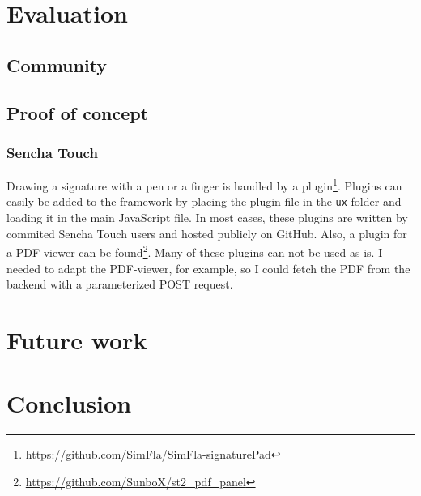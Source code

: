 \documentclass[a4paper]{artikel3}
\newcommand{\code}[1]{\texttt{#1}}
\renewcommand{\url}[1]{\href{http://#1}{#1}}
\renewcommand{\paragraph}[1]{{\bf #1} }
\begin{document}

\section{Evaluation}

\subsection{Community} %
\label{sec:community}


\subsection{Proof of concept} %
\label{sec:poc}

\subsubsection{Sencha Touch} %



Drawing a signature with a pen or a finger is handled by a plugin\footnote{\url{https://github.com/SimFla/SimFla-signaturePad}}.  Plugins can easily be added to the framework by placing the plugin file in the \code{ux} folder and loading it in the main JavaScript file.  In most cases,  these plugins are written by commited Sencha Touch users and hosted publicly on GitHub. Also,  a plugin for a PDF-viewer can be found\footnote{\url{https://github.com/SunboX/st2_pdf_panel}}.  Many of these plugins can not be used as-is.  I needed to adapt the PDF-viewer,  for example,  so I could fetch the PDF from the backend with a parameterized POST request.  




\section{Future work} %
\label{sec:future_work}

\section{Conclusion} %
\label{sec:conclusion}



\end{document}
